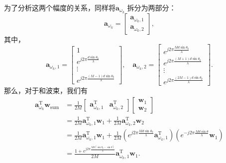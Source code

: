 为了分析这两个幅度的关系，同样将\( \bm{a}_{\omega_k} \) 拆分为两部分：
\[
    \bm{a}_{\omega_k} =
    \begin{bmatrix}
        \bm{a}_{\omega_k,1} \\
        \bm{a}_{\omega_k,2}
    \end{bmatrix},
\]
其中，
\[
    \bm{a}_{\omega_k,1} = \begin{bmatrix}
        1                                           \\
        e^{j 2 \pi \frac{d \sin \theta_k}{\lambda}} \\
        \vdots                                      \\
        e^{j 2 \pi \frac{(M-1) d \sin \theta_k}{\lambda}}
    \end{bmatrix}, \quad
    \bm{a}_{\omega_k,2} = \begin{bmatrix}
        e^{j 2 \pi \frac{M d \sin \theta_k}{\lambda}}     \\
        e^{j 2 \pi \frac{(M+1) d \sin \theta_k}{\lambda}} \\
        \vdots                                            \\
        e^{j 2 \pi \frac{(2M-1) d \sin \theta_k}{\lambda}}
    \end{bmatrix}.
\]
那么，对于和波束，我们有
\[
    \begin{split}
        \bm{a}_{\omega_k}^{\mathrm{T}} \bm{w}_{\text{sum}} & = \frac{1}{2M}\begin{bmatrix}
                                                                               \bm{a}_{\omega_k,1}^{\mathrm{T}} & \bm{a}_{\omega_k,2}^{\mathrm{T}}
                                                                           \end{bmatrix}
        \begin{bmatrix}
            \bm{w}_1 \\
            \bm{w}_2
        \end{bmatrix}                                                                                                                                                                                                                                                                                  \\
                                                           & = \frac{1}{2M} \bm{a}_{\omega_k,1}^{\mathrm{T}} \bm{w}_1 + \frac{1}{2M} \bm{a}_{\omega_k,2}^{\mathrm{T}} \bm{w}_2                                                                                                                          \\
                                                           & = \frac{1}{2M} \bm{a}_{\omega_k,1}^{\mathrm{T}} \bm{w}_1 + \frac{1}{2M} \left( e^{j 2 \pi \frac{M d \sin \theta_k}{\lambda}} \bm{a}_{\omega_k,1}^{\mathrm{T}} \right) \left( e^{-j 2 \pi \frac{M d \sin \theta}{\lambda}} \bm{w}_1 \right) \\
                                                           & = \frac{1 + e^{j 2\pi \frac{M d (\sin \theta_k - \sin \theta)}{\lambda}}}{2M} \bm{a}_{\omega_k,1}^{\mathrm{T}} \bm{w}_1.
    \end{split}
\]
